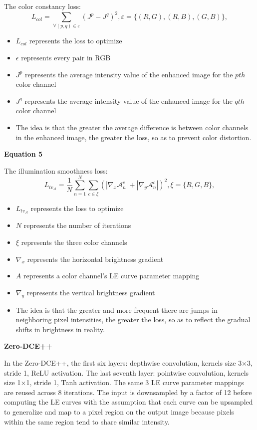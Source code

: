 \documentclass[11pt, letterpaper]{article}
\begin{document}
The color constancy loss:
\begin{equation*} 
L_{col}=\sum \limits _{\forall (p,q)\in \varepsilon }(J^{p}-J^{q})^2, \varepsilon =\lbrace (R,G),(R,B),(G,B)\rbrace, \end{equation*}
\begin{itemize}
  \item $L_{col}$ represents the loss to optimize
  \item $\epsilon$ represents every pair in RGB
  \item $J^p$ represents the average intensity value of the enhanced image for the $pth$ color channel
  \item $J^q$ represents the average intensity value of the enhanced image for the $qth$ color channel
  \item The idea is that the greater the average difference is between color channels in the enhanced image, the greater the loss, so as to prevent color distortion.
\end{itemize}

\textbf{Equation 5}

The illumination smoothness loss:
\begin{equation*} 
L_{tv_\mathcal {A}}=\frac{1}{N}\sum \limits _{n=1}^N\sum \limits _{c\in \xi }(|\nabla _{x}\mathcal {A}_{n}^{c}|+|\nabla _{y}\mathcal {A}_{n}^{c}|)^2, \xi =\lbrace R,G,B\rbrace, \end{equation*}
\begin{itemize}
  \item $L_{tv_\mathcal {A}}$ represents the loss to optimize
  \item $N$ represents the number of iterations
  \item $\xi$ represents the three color channels
  \item $\nabla _{x}$ represents the horizontal brightness gradient
  \item $A$ represents a color channel's LE curve parameter mapping
  \item $\nabla _{y}$ represents the vertical brightness gradient
  \item The idea is that the greater and more frequent there are jumps in neighboring pixel intensities, the greater the loss, so as to reflect the gradual shifts in brightness in reality.
\end{itemize}

\textbf{Zero-DCE++}

In the Zero-DCE++, the first six layers: depthwise convolution, kernels size 3×3, stride 1, ReLU activation. The last seventh layer: pointwise convolution, kernels size 1×1, stride 1, Tanh activation. The same 3 LE curve parameter mappings are reused across 8 iterations. The input is downsampled by a factor of 12 before computing the LE curves with the assumption that each curve can be upsampled to generalize and map to a pixel region on the output image because pixels within the same region tend to share similar intensity.
\end{document}
